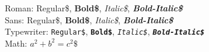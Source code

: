 \documentclass{article}
\begin{document}
Roman: Regular\$, \textbf{Bold\$}, \textit{Italic\$}, \textbf{\textit{Bold-Italic\$}} \\
Sans: \textsf{Regular\$}, \textsf{\textbf{Bold\$}}, \textsf{\textit{Italic\$}}, \textsf{\textbf{\textit{Bold-Italic\$}}} \\
Typewriter: \texttt{Regular\$}, \texttt{\textbf{Bold\$}}, \texttt{\textit{Italic\$}}, \texttt{\textbf{\textit{Bold-Italic\$}}} \\
Math: $a^2 + b^2 = c^2\$$
\end{document}
